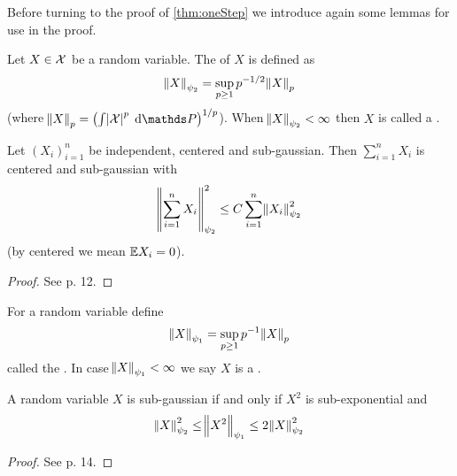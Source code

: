 
Before turning to the proof of \cref{thm:oneStep} we introduce again
some lemmas for use in the proof.

\begin{defn}
  Let $X \in \mathcal{X}$ be a random variable.
  The  of $X$ is defined as
  \begin{equation}
    \norm{X}_{\psi_2} = \sup_{p \geq 1} p^{-1/2} \norm{X}_p
  \end{equation}
  (where $\norm{X}_p = \left( \int \abs{\cl{X}}^p \difd \Prob \right)^{1/p}$).
  When $\norm{X}_{\psi_2} < \infty$ then $X$ is called a 
  .
  \label{defn:subgauss}
\end{defn}

\begin{lem}
  Let $(X_i)_{i=1}^n$ be independent, centered and sub-gaussian. Then
  $\sum_{i=1}^n X_i$ is centered and sub-gaussian with
  \begin{equation*} %
    \norm{\sum_{i=1}^n X_i}^2_{\psi_2} \leq C \sum_{i=1}^n \norm{X_i}_{\psi_2}^2
  \end{equation*}
  (by centered we mean $\mathbb{E} X_i = 0$).
  \label{lem:vershynin5_9}
\end{lem}
\begin{proof}
  See  p. 12.
\end{proof}

\begin{defn}
  For a random variable define
  \begin{equation*}
    \norm{X}_{\psi_1} = \sup_{p\geq 1} p^{-1} \norm{X}_p
  \end{equation*}
  called the .
  In case $\norm{X}_{\psi_1} < \infty$ we say $X$ is a
  .
\end{defn}

\begin{lem}
  A random variable $X$ is sub-gaussian if and only if $X^2$ is sub-exponential
  and
  \begin{equation*}
    \norm{X}^2_{\psi_2} \leq \norm{X^2}_{\psi_1} \leq 2 \norm{X}_{\psi_2}^2
  \end{equation*}
  \label{lem:vershynin5_14}
\end{lem}
\begin{proof}
  See  p. 14.
\end{proof}

